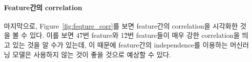 \documentclass[ba, 11pt]{imsart}
\begin{document}
\paragraph{Feature간의 correlation}
마지막으로, Figure~\ref{fig:feqture_corr}를 보면 feature간의 correlation을 시각화한 것을 볼 수 있다.
이를 보면 4\~7번 feature와 1\~2번 feature들이 매우 강한 correlation을 띄고 있는 것을 알 수가 있는데, 이 때문에 feature간의 independence를 이용하는 머신러닝 모델은 사용하지 않는 것이 좋을 것으로 예상할 수 있다.


\end{document}

